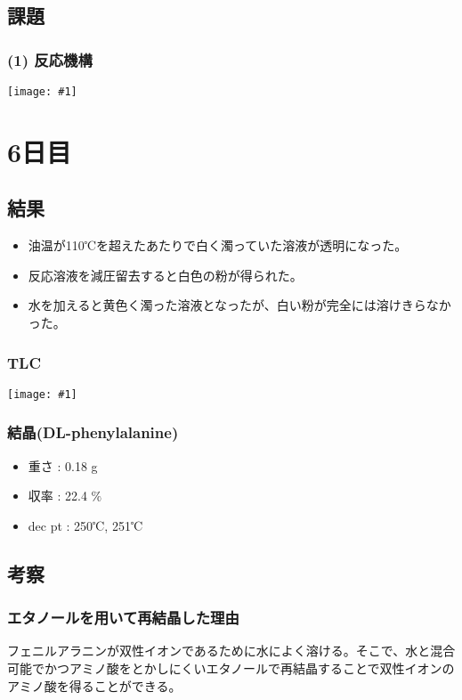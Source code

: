 \documentclass[a4paper,papersize,dvipdfmx]{jsarticle}
\newcommand{\pic}[1]{\begin{center} \texttt{[image: \#1]} \end{center}}   %
\newcommand{\pict}[2]{\begin{center} \texttt{[image: \#1]} \end{center}}   %
\begin{document}
\subsection*{課題}
\subsubsection*{(1) 反応機構}
\pic{imgs5/hk.jpeg}





\section*{6日目}

\subsection*{結果}
\begin{itemize}
\item 油温が110℃を超えたあたりで白く濁っていた溶液が透明になった。
\item 反応溶液を減圧留去すると白色の粉が得られた。
\item 水を加えると黄色く濁った溶液となったが、白い粉が完全には溶けきらなかった。

\end{itemize}
\subsubsection*{TLC}
\pict{imgs6/tlc.jpeg}{8}

\subsubsection*{結晶(DL-phenylalanine)}
\begin{itemize}
\item 重さ : 0.18 g
\item 収率 : 22.4 $\%$
\item dec pt : 250℃, 251℃

\end{itemize}
\subsection*{考察}
\subsubsection*{エタノールを用いて再結晶した理由}
フェニルアラニンが双性イオンであるために水によく溶ける。そこで、水と混合可能でかつアミノ酸をとかしにくいエタノールで再結晶することで双性イオンのアミノ酸を得ることができる。
\end{document}
